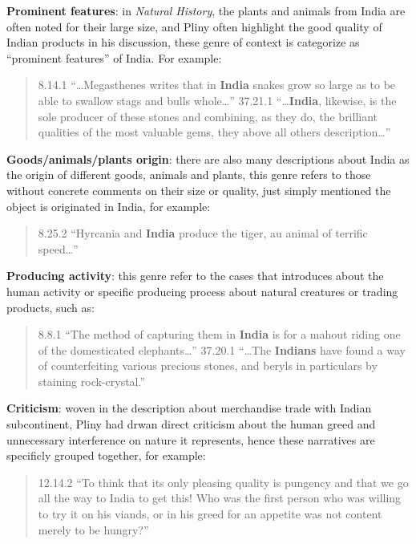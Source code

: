 \documentclass[
  12pt,
]{article}
\begin{document}
\textbf{Prominent features}: in \emph{Natural History}, the plants and
animals from India are often noted for their large size, and Pliny often
highlight the good quality of Indian products in his discussion, these
genre of context is categorize as ``prominent features'' of India. For
example:

\begin{quote}
8.14.1 ``\ldots Megasthenes writes that in \textbf{India} snakes grow so
large as to be able to swallow stags and bulls whole\ldots{}'' 37.21.1
``\ldots{}\textbf{India}, likewise, is the sole producer of these stones
and combining, as they do, the brilliant qualities of the most valuable
gems, they above all others description\ldots{}''
\end{quote}

\textbf{Goods/animals/plants origin}: there are also many descriptions
about India as the origin of different goods, animals and plants, this
genre refers to those without concrete comments on their size or
quality, just simply mentioned the object is originated in India, for
example:

\begin{quote}
8.25.2 ``Hyrcania and \textbf{India} produce the tiger, au animal of
terrific speed\ldots{}''
\end{quote}

\textbf{Producing activity}: this genre refer to the cases that
introduces about the human activity or specific producing process about
natural creatures or trading products, such as:

\begin{quote}
8.8.1 ``The method of capturing them in \textbf{India} is for a mahout
riding one of the domesticated elephants\ldots{}'' 37.20.1 ``\ldots The
\textbf{Indians} have found a way of counterfeiting various precious
stones, and beryls in particulars by staining rock-crystal.''
\end{quote}

\textbf{Criticism}: woven in the description about merchandise trade
with Indian subcontinent, Pliny had drwan direct criticism about the
human greed and unnecessary interference on nature it represents, hence
these narratives are specificly grouped together, for example:

\begin{quote}
12.14.2 ``To think that its only pleasing quality is pungency and that
we go all the way to India to get this! Who was the first person who was
willing to try it on his viands, or in his greed for an appetite was not
content merely to be hungry?''
\end{quote}
\end{document}
